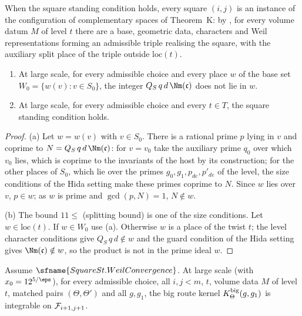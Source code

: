 When the square standing condition holds, every square $(i,j)$ is an instance of the configuration of complementary
spaces of Theorem~K: by , for every volume datum $M$ of
level $t$ there are a base, geometric data, characters and Weil representations forming an admissible triple realising
the square, with the auxiliary split place of the triple outside $\mathrm{loc}(t)$.

\begin{lemma}[Standing]\label{pf:rowprops:standing}
\begin{enumerate}[label=(\alph*)]
\item At large scale, for every admissible choice and every place $w$ of the base set $W_0=\{w(v):v\in S_0\}$, the integer
$Q_S\,q\,d\,\Nm(\mathfrak c)$ does not lie in $w$.
\item At large scale, for every admissible choice and every $t\in T$, the square standing condition holds.
\end{enumerate}
\end{lemma}

\begin{proof}
(a) Let $w=w(v)$ with $v\in S_0$. There is a rational prime $p$ lying in $v$ and coprime to $N=Q_S\,q\,d\,\Nm(\mathfrak c)$:
for $v=v_0$ take the auxiliary prime $q_0$ over which $v_0$ lies, which is coprime to the invariants of the host by its
construction; for the other places of $S_0$, which lie over the primes $g_0,g_1,p_{de},p'_{de}$ of the level, the size
conditions of the Hida setting make these primes coprime to $N$. Since $w$ lies over $v$, $p\in w$; as $w$ is prime and
$\gcd(p,N)=1$, $N\notin w$.

(b) The bound $11\le$ (splitting bound) is one of the size conditions. Let $w\in\mathrm{loc}(t)$. If $w\in W_0$ use (a).
Otherwise $w$ is a place of the twist $t$; the level character conditions give $Q_S\,q\,d\notin w$ and the guard condition
of the Hida setting gives $\Nm(\mathfrak c)\notin w$, so the product is not in the prime ideal $w$.
\end{proof}

\begin{lemma}\label{pf:rowprops:bigint}
Assume $\sfname{SquareSt.WeilConvergence}$. At large scale (with $x_0=12^{5/\eps}$), for every admissible choice, all
$i,j<m$, $t$, volume data $M$ of level $t$, matched pairs $(\Theta,\Theta')$ and all $g,g_1$, the big route kernel
$K^{\mathrm{big}}_\Theta(g,g_1)$ is integrable on $\mathcal{F}_{i+1,j+1}$.
\end{lemma}


